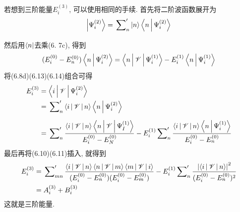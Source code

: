 若想到三阶能量$E_i^{(3)}$, 
可以使用相同的手续. 
首先将二阶波函数展开为
\begin{align}
\Ket{\Psi_i^{(2)}} = \sideset{}{'}{\sum_n}\Ket{n}\Braket{n|\Psi_i^{(2)}}
\end{align}
然后用$\Bra{n}$去乘(6.
7c), 
得到
\begin{align}
(E_i^{(0)} -E_n^{(0)} )\Braket{n|\Psi_i^{(2)}} = \Braket{n|\mathscr{V}|\Psi_i^{(1)}} - E_i^{(1)}\Braket{n|\Psi_i^{(1)}}
\end{align}
将(6.8d)(6.13)(6.14)组合可得
\begin{align*}
E_i^{(3)} & = \Braket{i|\mathscr{V}|\Psi_i^{(2)}}\\
		  & = \sideset{}{'}{\sum_n}\Braket{i|\mathscr{V}|n}\Braket{n|\Psi_i^{(2)}}\\
		  & =\sideset{}{'}{\sum_n}\frac{\Braket{i|\mathscr{V}|n}\Braket{n|\mathscr{V}|\Psi_I^{(1)}}}{E_i^{(0)} - E_N^{(0)}} - E_i^{(1)} \sideset{}{'}{\sum_n}\frac{\Braket{i|\mathscr{V}|n}\Braket{n|\Psi_i^{(1)}}}{E_i^{(0)} - E_n^{(0)} }
\end{align*}
最后再将(6.10)(6.11)插入, 
就得到
\begin{align}
E_i^{(3)} & =\sideset{}{'}{\sum_{mn}}\frac{\Braket{i|\mathscr{V}|n}\Braket{n|\mathscr{V}|m}\Braket{m|\mathscr{V}|i} }{(E_i^{(0)} -E_n^{(0)})(E_i^{(0)} - E_m^{(0)} )  } - E_i^{(1)} \sideset{}{'}{\sum_n} \frac{\left| \Braket{i|\mathscr{V}|n} \right|^2}{(E_i^{(0)} -E_n^{(0)} )^2}\notag\\
& = A_i^{(3)} + B_i^{(3)}
\label{6.15}
\end{align}
这就是三阶能量.


